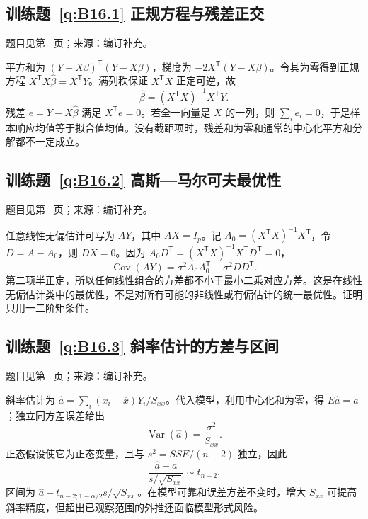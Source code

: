 \subsection*{训练题~\ref{q:B16.1} 正规方程与残差正交}\label{a:B16.1}{\small 题目见第~\pageref{q:B16.1} 页；来源：编订补充。}
\begin{solve}平方和为 $(Y-X\beta)^\mathsf T(Y-X\beta)$，梯度为 $-2X^\mathsf T(Y-X\beta)$。令其为零得到正规方程 $X^\mathsf TX\widehat\beta=X^\mathsf TY$。满列秩保证 $X^\mathsf TX$ 正定可逆，故\[\widehat\beta=(X^\mathsf TX)^{-1}X^\mathsf TY.\]残差 $e=Y-X\widehat\beta$ 满足 $X^\mathsf Te=0$。若全一向量是 $X$ 的一列，则 $\sum_ie_i=0$，于是样本响应均值等于拟合值均值。没有截距项时，残差和为零和通常的中心化平方和分解都不一定成立。\end{solve}

\subsection*{训练题~\ref{q:B16.2} 高斯—马尔可夫最优性}\label{a:B16.2}{\small 题目见第~\pageref{q:B16.2} 页；来源：编订补充。}
\begin{solve}任意线性无偏估计可写为 $AY$，其中 $AX=I_p$。记 $A_0=(X^\mathsf TX)^{-1}X^\mathsf T$，令 $D=A-A_0$，则 $DX=0$。因为 $A_0D^\mathsf T=(X^\mathsf TX)^{-1}X^\mathsf TD^\mathsf T=0$，\[\operatorname{Cov}(AY)=\sigma^2A_0A_0^\mathsf T+\sigma^2DD^\mathsf T.\]第二项半正定，所以任何线性组合的方差都不小于最小二乘对应方差。这是在线性无偏估计类中的最优性，不是对所有可能的非线性或有偏估计的统一最优性。证明只用一二阶矩条件。\end{solve}

\subsection*{训练题~\ref{q:B16.3} 斜率估计的方差与区间}\label{a:B16.3}{\small 题目见第~\pageref{q:B16.3} 页；来源：编订补充。}
\begin{solve}斜率估计为 $\widehat a=\sum_i(x_i-\overline x)Y_i/S_{xx}$。代入模型，利用中心化和为零，得 $E\widehat a=a$；独立同方差误差给出\[\operatorname{Var}(\widehat a)=\frac{\sigma^2}{S_{xx}}.\]正态假设使它为正态变量，且与 $s^2=SSE/(n-2)$ 独立，因此\[\frac{\widehat a-a}{s/\sqrt{S_{xx}}}\sim t_{n-2}.\]区间为 $\widehat a\pm t_{n-2;1-\alpha/2}s/\sqrt{S_{xx}}$。在模型可靠和误差方差不变时，增大 $S_{xx}$ 可提高斜率精度，但超出已观察范围的外推还面临模型形式风险。\end{solve}

